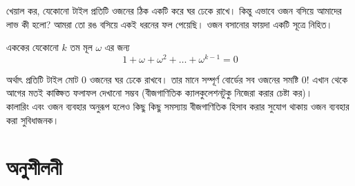 \documentclass[11pt]{report}
\begin{document}
\begin{center}
\end{center}

খেয়াল কর, যেকোনো টাইল প্রতিটি ওজনের ঠিক একটি করে ঘর ঢেকে রাখে। কিন্তু এভাবে ওজন বসিয়ে আমাদের লাভ কী হলো? আমরা তো রঙ বসিয়ে একই ধরনের ফল পেয়েছি। ওজন বসানোর ফায়দা একটি সূত্রে নিহিত।\\

\begin{tcolorbox}[colframe=blue!80!blue]
এককের যেকোনো $k$ তম মূল $\omega$ এর জন্য $$1+ \omega +\omega^2+ \ldots+\omega^{k-1} = 0$$
\end{tcolorbox}

অর্থাৎ প্রতিটি টাইল মোট $0$ ওজনের ঘর ঢেকে রাখবে। তার মানে সম্পূর্ণ বোর্ডের সব ওজনের সমষ্টি $0$! এখান থেকে আগের মতই কাঙ্ক্ষিত ফলাফল দেখানো সম্ভব (বীজগাণিতিক ক্যালকুলেশনটুকু নিজেরা করার চেষ্টা কর)।\\

কালারিং এবং ওজন ব্যবহার অনুরূপ হলেও কিছু কিছু সমস্যায় বীজগাণিতিক হিসাব করার সুযোগ থাকায় ওজন ব্যবহার করা সুবিধাজনক।

\newpage

\section{অনুশীলনী}
\end{document}
